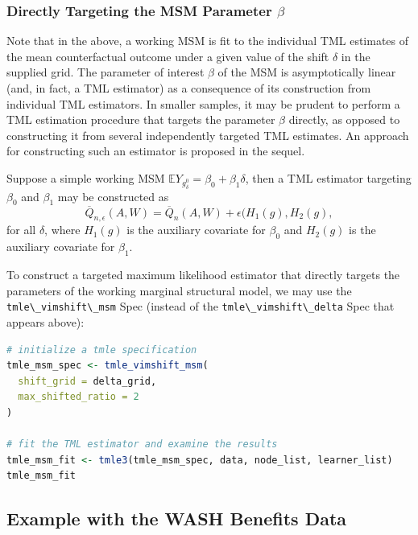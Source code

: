 \documentclass[12pt, krantz2,]{krantz}
\newcommand{\passthrough}[1]{#1}
\theoremstyle{definition}
\theoremstyle{definition}
\theoremstyle{definition}
\newcommand{\1}{\mathbbm{1}}
\begin{document}
\hypertarget{directly-targeting-the-msm-parameter-beta}{%
\subsubsection{\texorpdfstring{Directly Targeting the MSM Parameter \(\beta\)}{Directly Targeting the MSM Parameter \textbackslash{}beta}}\label{directly-targeting-the-msm-parameter-beta}}

Note that in the above, a working MSM is fit to the individual TML estimates of
the mean counterfactual outcome under a given value of the shift \(\delta\) in the
supplied grid. The parameter of interest \(\beta\) of the MSM is asymptotically
linear (and, in fact, a TML estimator) as a consequence of its construction from
individual TML estimators. In smaller samples, it may be prudent to perform a
TML estimation procedure that targets the parameter \(\beta\) directly, as opposed
to constructing it from several independently targeted TML estimates. An
approach for constructing such an estimator is proposed in the sequel.

Suppose a simple working MSM \(\mathbb{E}Y_{g^0_{\delta}} = \beta_0 + \beta_1 \delta\), then a TML estimator targeting \(\beta_0\) and \(\beta_1\) may be
constructed as
\[\overline{Q}_{n, \epsilon}(A,W) = \overline{Q}_n(A,W) + \epsilon (H_1(g),
H_2(g),\] for all \(\delta\), where \(H_1(g)\) is the auxiliary covariate for
\(\beta_0\) and \(H_2(g)\) is the auxiliary covariate for \(\beta_1\).

To construct a targeted maximum likelihood estimator that directly targets the
parameters of the working marginal structural model, we may use the
\passthrough{\lstinline!tmle\_vimshift\_msm!} Spec (instead of the \passthrough{\lstinline!tmle\_vimshift\_delta!} Spec that
appears above):

\begin{lstlisting}[language=R]
# initialize a tmle specification
tmle_msm_spec <- tmle_vimshift_msm(
  shift_grid = delta_grid,
  max_shifted_ratio = 2
)

# fit the TML estimator and examine the results
tmle_msm_fit <- tmle3(tmle_msm_spec, data, node_list, learner_list)
tmle_msm_fit
\end{lstlisting}

\hypertarget{example-with-the-wash-benefits-data}{%
\subsection{Example with the WASH Benefits Data}\label{example-with-the-wash-benefits-data}}
\end{document}
